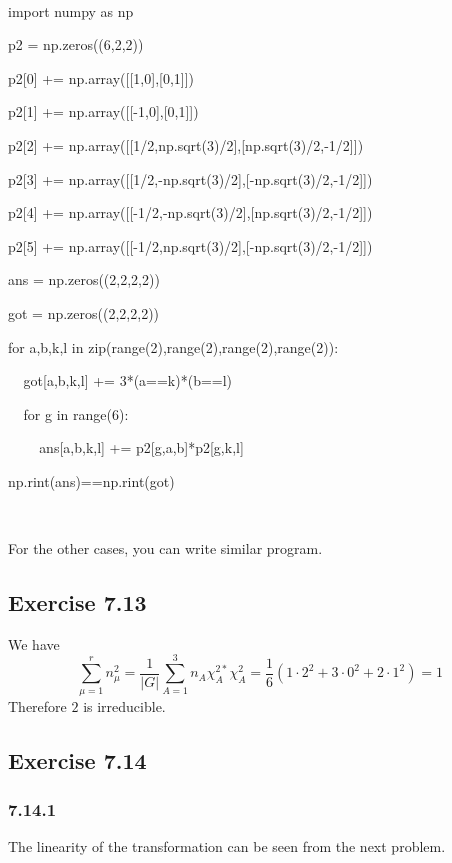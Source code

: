 \documentclass[]{ctexart}
\begin{document}
$\;$

import numpy as np

p2 = np.zeros((6,2,2))

p2[0] += np.array([[1,0],[0,1]])

p2[1] += np.array([[-1,0],[0,1]])

p2[2] += np.array([[1/2,np.sqrt(3)/2],[np.sqrt(3)/2,-1/2]])

p2[3] += np.array([[1/2,-np.sqrt(3)/2],[-np.sqrt(3)/2,-1/2]])

p2[4] += np.array([[-1/2,-np.sqrt(3)/2],[np.sqrt(3)/2,-1/2]])

p2[5] += np.array([[-1/2,np.sqrt(3)/2],[-np.sqrt(3)/2,-1/2]])

ans = np.zeros((2,2,2,2))

got = np.zeros((2,2,2,2))

for a,b,k,l in zip(range(2),range(2),range(2),range(2)):

$\;\;\;\;$got[a,b,k,l] += 3*(a==k)*(b==l)

$\;\;\;\;$for g in range(6):

$\;\;\;\;\;\;\;\;$ans[a,b,k,l] += p2[g,a,b]*p2[g,k,l]

np.rint(ans)==np.rint(got)

$\;$

For the other cases, you can write similar program. 
\subsection{Exercise 7.13}
We have 
\begin{equation*}
\sum_{\mu=1}^{r}n_\mu^2=\frac{1}{|G|}\sum_{A=1}^3n_A\chi_A^{2*}\chi_A^2=\frac{1}{6}(1\cdot 2^2+3\cdot 0^2+2\cdot 1^2)=1
\end{equation*}
Therefore $2$ is irreducible. 
\subsection{Exercise 7.14}
\subsubsection*{7.14.1}
The linearity of the transformation can be seen from the next problem. 
\end{document}
